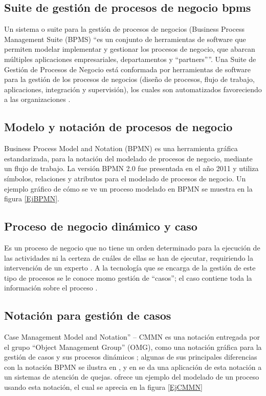 \subsection{Suite de gestión de procesos de negocio bpms}

Un sistema o suite para la gestión de procesos de negocios (Business Process Management Suite (BPMS) “es un conjunto de herramientas de software que permiten modelar implementar y gestionar los procesos de negocio, que abarcan múltiples aplicaciones empresariales, departamentos y ``partners''”\citep{smith2003business}. Una Suite de Gestión de Procesos de Negocio está conformada por herramientas de software para la gestión de los procesos de negocios (diseño de procesos, flujo de trabajo, aplicaciones, integración y supervisión), los cuales son automatizados favoreciendo a las organizaciones \citep{underdahl2013gestion}.

\subsection{Modelo y notación de procesos de negocio}

Business Process Model and Notation (BPMN) es una herramienta gráfica estandarizada, para la notación del modelado de procesos de negocio, mediante un flujo de trabajo. La versión BPMN 2.0 fue presentada en el año 2011 \citep{omg2011business} y utiliza símbolos, relaciones y atributos para el modelado de procesos de negocio. Un ejemplo gráfico de cómo se ve un proceso modelado en BPMN se muestra en la figura \ref{EjBPMN}.

\subsection{Proceso de negocio dinámico y caso}

Es un proceso de negocio que no tiene un orden determinado para la ejecución de las actividades ni la certeza de cuáles de ellas se han de ejecutar, requiriendo la intervención de un experto \citep{hitpass2017bpmn}. A la tecnología que se encarga de la gestión de este tipo de procesos se le conoce momo gestión de “casos”; el caso contiene toda la información sobre el proceso \citep{marin2016introduction}.

\subsection{Notación para gestión de casos}

Case Management Model and Notation” – CMMN es una notación entregada por el grupo “Object Management Group” (OMG), como una notación gráfica para la gestión de casos y sus procesos dinámicos \citep{hauder2014research}; algunas de sus principales diferencias con la notación BPMN se ilustra en \citep{breitenmoser2015case}, y en \citep{marin2016introduction} se da una aplicación de esta notación a un sistemas de atención de quejas. \citet{auer2014business} ofrece un ejemplo del modelado de un proceso usando esta notación, el cual se aprecia en la figura \ref{EjCMMN}

